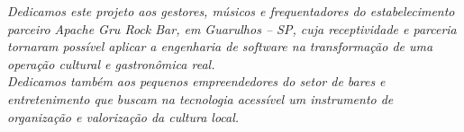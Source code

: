 \begin{dedicatoria}
	\vspace*{\fill}
	\center
	\begin{flushright}
		\begin{minipage}{0.65\textwidth}
		\emph{Dedicamos este projeto aos gestores, músicos e frequentadores do estabelecimento parceiro Apache Gru Rock Bar, em Guarulhos -- SP, cuja receptividade e parceria tornaram possível aplicar a engenharia de software na transformação de uma operação cultural e gastronômica real.\\[0.3cm]
		Dedicamos também aos pequenos empreendedores do setor de bares e entretenimento que buscam na tecnologia acessível um instrumento de organização e valorização da cultura local.}
		\end{minipage}
	\end{flushright}
\end{dedicatoria}
